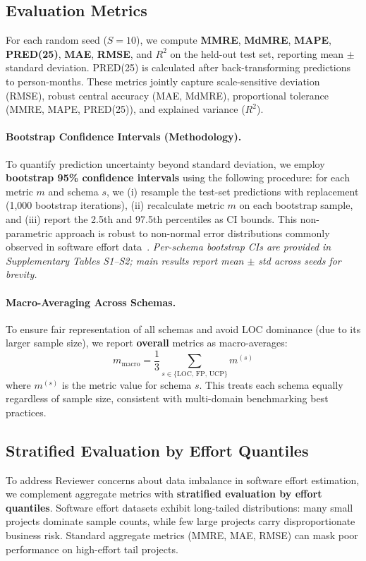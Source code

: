 \documentclass{ieeeaccess}
\begin{document}
\subsection{Evaluation Metrics}
For each random seed ($S{=}10$), 
we compute \textbf{MMRE}, \textbf{MdMRE}, \textbf{MAPE}, \textbf{PRED(25)}, \textbf{MAE}, \textbf{RMSE}, 
and \textbf{$R^2$} on the held-out test set, reporting mean $\pm$ standard deviation.  
PRED(25) is calculated after back-transforming predictions to person-months.  
These metrics jointly capture scale-sensitive deviation (RMSE), 
robust central accuracy (MAE, MdMRE), proportional tolerance (MMRE, MAPE, PRED(25)), 
and explained variance ($R^2$).

\paragraph{Bootstrap Confidence Intervals (Methodology).}
To quantify prediction uncertainty beyond standard deviation, we employ \textbf{bootstrap 95\% confidence intervals} using the following procedure: for each metric $m$ and schema $s$, we (i) resample the test-set predictions with replacement (1,000 bootstrap iterations), (ii) recalculate metric $m$ on each bootstrap sample, and (iii) report the 2.5th and 97.5th percentiles as CI bounds. This non-parametric approach is robust to non-normal error distributions commonly observed in software effort data~\cite{efron1994bootstrap}. \textit{Per-schema bootstrap CIs are provided in Supplementary Tables S1--S2; main results report mean $\pm$ std across seeds for brevity.}

\paragraph{Macro-Averaging Across Schemas.}
To ensure fair representation of all schemas and avoid LOC dominance (due to its larger sample size), we report \textbf{overall} metrics as macro-averages:
\[
m_{\text{macro}} = \frac{1}{3}\sum_{s \in \{\text{LOC, FP, UCP}\}} m^{(s)}
\]
where $m^{(s)}$ is the metric value for schema $s$. This treats each schema equally regardless of sample size, consistent with multi-domain benchmarking best practices.

\subsection{Stratified Evaluation by Effort Quantiles}
\label{sec:stratified-eval}

To address Reviewer concerns about data imbalance in software effort estimation, we complement aggregate metrics with \textbf{stratified evaluation by effort quantiles}. Software effort datasets exhibit long-tailed distributions: many small projects dominate sample counts, while few large projects carry disproportionate business risk. Standard aggregate metrics (MMRE, MAE, RMSE) can mask poor performance on high-effort tail projects.
\end{document}
